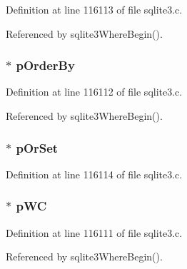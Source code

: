 Definition at line 116113 of file sqlite3.\+c.



Referenced by sqlite3\+Where\+Begin().

\hypertarget{struct_where_loop_builder_a9150e506e5902e336130c9764caf96a0}{}
\subsubsection[{p\+Order\+By}]{$\ast$ p\+Order\+By}\label{struct_where_loop_builder_a9150e506e5902e336130c9764caf96a0}


Definition at line 116112 of file sqlite3.\+c.



Referenced by sqlite3\+Where\+Begin().

\hypertarget{struct_where_loop_builder_ad2fa0e4c27168f8c6fdcf8a94a04bd41}{}
\subsubsection[{p\+Or\+Set}]{$\ast$ p\+Or\+Set}\label{struct_where_loop_builder_ad2fa0e4c27168f8c6fdcf8a94a04bd41}


Definition at line 116114 of file sqlite3.\+c.

\hypertarget{struct_where_loop_builder_ab85657232a3c235326f1e0dd179e32b7}{}
\subsubsection[{p\+W\+C}]{$\ast$ p\+W\+C}\label{struct_where_loop_builder_ab85657232a3c235326f1e0dd179e32b7}


Definition at line 116111 of file sqlite3.\+c.



Referenced by sqlite3\+Where\+Begin().

\hypertarget{struct_where_loop_builder_a831ff4750d43c35052a460caacac1bac}{}
